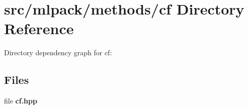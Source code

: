 \section{src/mlpack/methods/cf Directory Reference}
\label{dir_52ad0f18133b469061a6a8352ae9823d}
Directory dependency graph for cf\-:
\subsection*{Files}
\begin{DoxyCompactItemize}
\item 
file {\bf cf.\-hpp}
\end{DoxyCompactItemize}
